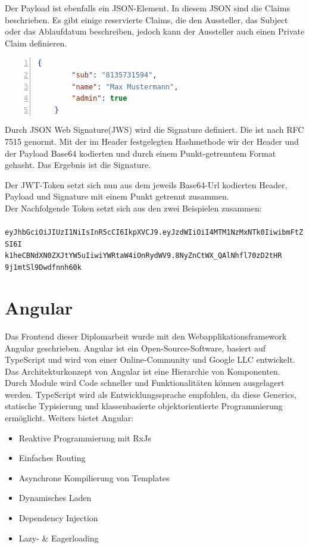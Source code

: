 Der Payload ist ebenfalls ein JSON-Element. In diesem JSON sind die Claims beschrieben. Es gibt einige reservierte Claims, die den Aussteller, das Subject oder das Ablaufdatum beschreiben, jedoch kann der Aussteller auch einen Private Claim definieren. \autocite{wikiJWT} \\
\begin{lstlisting}[caption={JWT-Payload Beispiel},captionpos=b, numbers=left, backgroundcolor=\color{black!10}, language=json]
	{
		"sub": "8135731594",
		"name": "Max Mustermann",
		"admin": true
	}
\end{lstlisting}

Durch JSON Web Signature(JWS) wird die Signature definiert. Die ist nach RFC 7515 genormt. Mit der im Header festgelegten Hashmethode wir der Header und der Payload Base64 kodierten und durch einem Punkt-getrenntem Format gehasht. Das Ergebnis ist die Signature. \autocite{wikiJWT}

Der JWT-Token setzt sich nun aus dem jeweils Base64-Url kodierten Header, Payload und Signature mit einem Punkt getrennt zusammen. \autocite{wikiJWT} \\
Der Nachfolgende Token setzt sich aus den zwei Beispielen zusammen:\\
\texttt{
eyJhbGciOiJIUzI1NiIsInR5cCI6IkpXVCJ9.eyJzdWIiOiI4MTM1NzMxNTk0IiwibmFtZSI6I\\k1heCBNdXN0ZXJtYW5uIiwiYWRtaW4iOnRydWV9.8NyZnCtWX\_QAlNhfl70zD2tHR\\9j1mtSl9Dwdfnnh60k
}
\section{Angular}
Das Frontend dieser Diplomarbeit wurde mit den Webapplikationsframework Angular geschrieben. Angular ist ein Open-Source-Software, basiert auf TypeScript und wird von einer Online-Community und Google LLC entwickelt.\\
Das Architekturkonzept von Angular ist eine Hierarchie von Komponenten. Durch Module wird Code schneller und Funktionalitäten können ausgelagert werden. TypeScript wird als Entwicklungssprache empfohlen, da diese Generics, statische Typisierung und klassenbasierte objektorientierte Programmierung ermöglicht. \autocite{wikiAngular}
Weiters bietet Angular:

\begin{itemize}
	\item Reaktive Programmierung mit RxJs
	\item Einfaches Routing
	\item Asynchrone Kompilierung von Templates
	\item Dynamisches Laden
	\item Dependency Injection
	\item Lazy- \& Eagerloading
\end{itemize}

